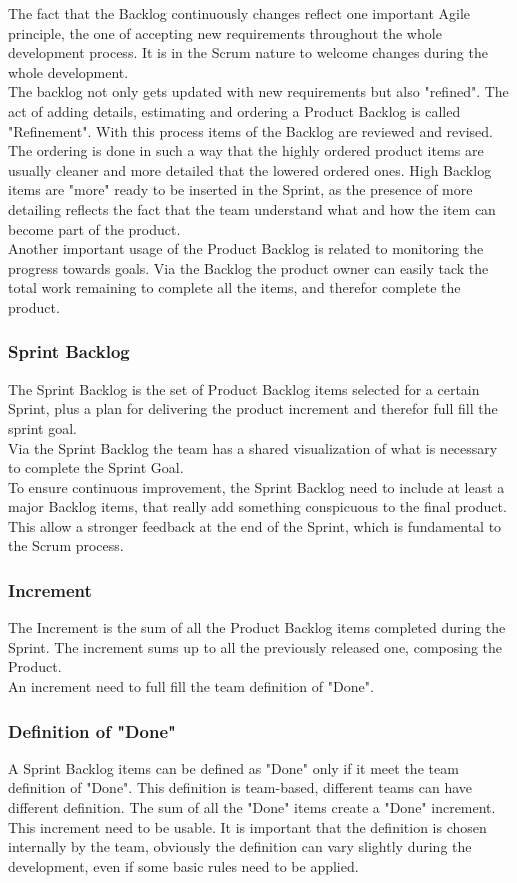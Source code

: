 \documentclass[../main.tex]{subfiles}
\begin{document}
The fact that the Backlog continuously changes reflect one important Agile principle, the one of accepting new requirements throughout the whole development process. It is in the Scrum nature to welcome changes during the whole development.\\

The backlog not only gets updated with new requirements but also "refined". The act of adding details, estimating and ordering a Product Backlog is called "Refinement". With this process items of the Backlog are reviewed and revised. The ordering is done in such a way that the highly ordered product items are usually cleaner and more detailed that the lowered ordered ones. High Backlog items are "more" ready to be inserted in the Sprint, as the presence of more detailing reflects the fact that the team understand what and how the item can become part of the product. \\

Another important usage of the Product Backlog is related to monitoring the progress towards goals. Via the Backlog the product owner can easily tack the total work remaining to complete all the items, and therefor complete the product. 
\subsubsection{Sprint Backlog}
The Sprint Backlog is the set of Product Backlog items selected for a certain Sprint, plus a plan for delivering the product increment and therefor full fill the sprint goal.\\
Via the Sprint Backlog the team has a shared visualization of what is necessary to complete the Sprint Goal.\\
To ensure continuous improvement, the Sprint Backlog need to include at least a major Backlog items, that really add something conspicuous to the final product. This allow a stronger feedback at the end of the Sprint, which is fundamental to the Scrum process. 
\subsubsection{Increment}
The Increment is the sum of all the Product Backlog items completed during the Sprint. The increment sums up to all the previously released one, composing the Product.\\
An increment need to full fill the team definition of "Done".
\subsubsection{Definition of "Done"}
A Sprint Backlog items can be defined as "Done" only if it meet the team definition of "Done". This definition is team-based, different teams can have different definition. The sum of all the "Done" items create a "Done" increment. This increment need to be usable. It is important that the definition is chosen internally by the team, obviously the definition can vary slightly during the development, even if some basic rules need to be applied.
\end{document}
